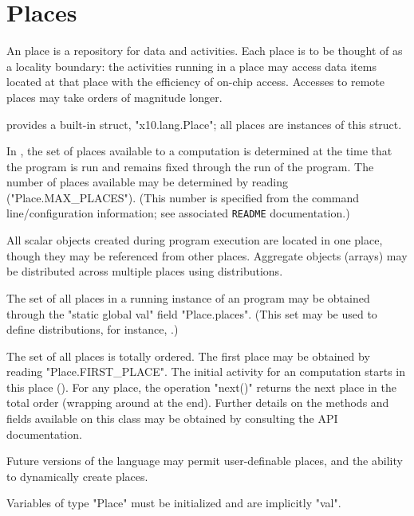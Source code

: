 \chapter{Places}\label{XtenPlaces}

An \Xten{} place is a repository for data and activities. Each place
is to be thought of as a locality boundary: the activities running in
a place may access data items located at that place with the
efficiency of on-chip access. Accesses to remote places may take
orders of magnitude longer.

{}\Xten{} provides a built-in struct, \xcd"x10.lang.Place"; all
places are instances of this struct. 

In \XtenCurrVer{}, the set of places available to a computation is
determined at the time that the program is run and remains fixed
through the run of the program. The number of places available 
may be determined by reading (\xcd"Place.MAX_PLACES"). (This number
is specified from the command line/configuration information; 
see associated {\tt README} documentation.)

All scalar objects created during program execution are located in one
place, though they may be referenced from other places. Aggregate
objects (arrays) may be distributed across multiple places using
distributions.

The set of all places in a running instance of an \Xten{} program may
be obtained through the \xcd"static global val" field \xcd"Place.places".  (This
set may be used to define distributions, for instance,
.) 


The set of all places is totally ordered.  The first place may be
obtained by reading \xcd"Place.FIRST_PLACE". The initial activity for
an \Xten{} computation starts in this place
(). For any place, the operation \xcd"next()"
returns the next place in the total order (wrapping around at the
end). Further details on the methods and fields available on this
class may be obtained by consulting the API documentation.

\begin{note}
Future versions of the language may permit user-definable
places, and the ability to dynamically create places.
\end{note}

\begin{staticrule*}
Variables of type \xcd"Place" must be initialized and are implicitly
\xcd"val".  
\end{staticrule*}

